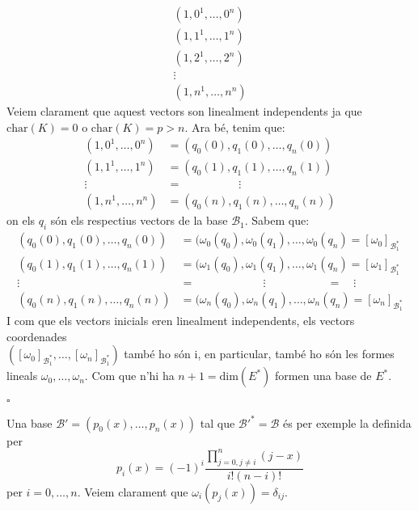 \documentclass[11pt,a4paper]{article}
\newcommand*{\QED}{\hfill\ensuremath{\square}}
\begin{document}
\begin{enumerate}
\begin{enumerate}
\begin{itemize}
            \begin{gather*}
                (1,0^1,\ldots,0^n)\\
                (1,1^1,\ldots,1^n)\\
                (1,2^1,\ldots,2^n)\\
                \vdots\\
                (1,n^1,\ldots,n^n)
            \end{gather*}
            Veiem clarament que aquest vectors son linealment independents ja que $\text{char}(K)=0$ o $\text{char}(K)=p>n$. Ara bé, tenim que:
            \begin{align*}
                (1,0^1,\ldots,0^n)&=(q_0(0),q_1(0),\ldots,q_n(0))\\
                (1,1^1,\ldots,1^n)&=(q_0(1),q_1(1),\ldots,q_n(1))\\
                \vdots\qquad\quad&=\qquad\qquad\quad\vdots\\
                (1,n^1,\ldots,n^n)&=(q_0(n),q_1(n),\ldots,q_n(n))
            \end{align*}
            on els $q_i$ són els respectius vectors de la base $\mathcal{B}_1$. Sabem que:
            \begin{align*}
                (q_0(0),q_1(0),\ldots,q_n(0))&=(\omega_0(q_0),\omega_0(q_1),\ldots,\omega_0(q_n)=[\omega_0]_{\mathcal{B}_1^*}\\
                (q_0(1),q_1(1),\ldots,q_n(1))&=(\omega_1(q_0),\omega_1(q_1),\ldots,\omega_1(q_n)=[\omega_1]_{\mathcal{B}_1^*}\\
                \vdots\qquad\qquad&=\qquad\qquad\qquad\vdots\qquad\qquad\quad\;\,=\quad\vdots\\
                (q_0(n),q_1(n),\ldots,q_n(n))&=(\omega_n(q_0),\omega_n(q_1),\ldots,\omega_n(q_n)=[\omega_n]_{\mathcal{B}_1^*}
            \end{align*}
            I com que els vectors inicials eren linealment independents, els vectors coordenades\\ $([\omega_0]_{\mathcal{B}_1^*},\ldots,[\omega_n]_{\mathcal{B}_1^*})$ també ho són i, en particular, també ho són les formes lineals $\omega_0,\ldots,\omega_n$. Com que n'hi ha $n+1=\text{dim}(E^*)$ formen una base de $E^*$.
        \end{itemize}\QED\par Una base $\mathcal{B'}=(p_0(x),\ldots,p_n(x))$ tal que $\mathcal{B'}^*=\mathcal{B}$ és per exemple la definida per $$p_i(x)=(-1)^i\frac{\prod_{j=0,j\neq i}^n(j-x)}{i!(n-i)!}$$ per $i=0,\ldots,n$. Veiem clarament que $\omega_i(p_j(x))=\delta_{ij}$.

\end{enumerate}
\end{enumerate}
\end{document}

